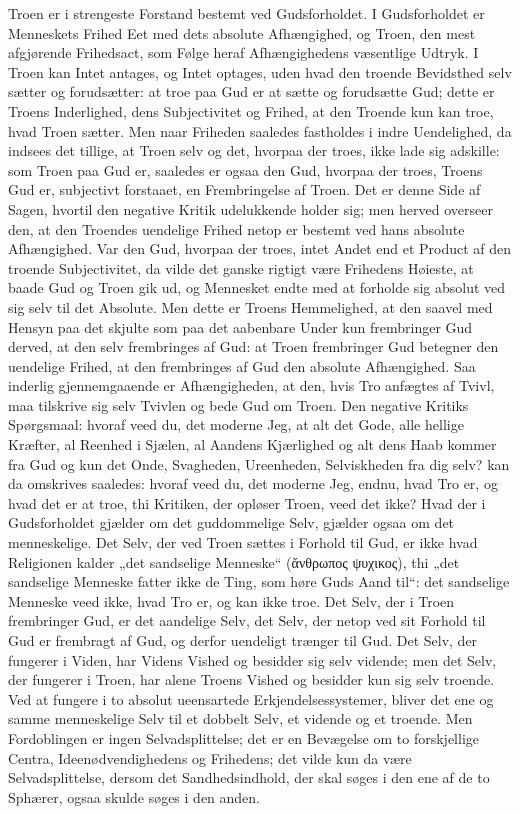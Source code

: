 \documentclass[12pt]{book}
\begin{document}
Troen er i strengeste Forstand bestemt ved Gudsforholdet. I
Gudsforholdet er Menneskets Frihed Eet
med dets absolute Afhængighed, og Troen, den mest afgjørende
Frihedsact, som Følge heraf Afhængighedens væsentlige Udtryk. I
Troen kan Intet antages, og Intet optages, uden hvad den troende
Bevidsthed selv sætter og forudsætter: at troe paa Gud er at sætte
og forudsætte Gud; dette er Troens Inderlighed, dens Subjectivitet
og Frihed, at den Troende kun kan troe, hvad Troen sætter. Men naar
Friheden saaledes fastholdes i indre Uendelighed, da indsees det
tillige, at Troen selv og det, hvorpaa der troes, ikke lade sig
adskille: som Troen paa Gud er, saaledes er ogsaa den Gud, hvorpaa
der troes, Troens Gud er, subjectivt forstaaet, en Frembringelse af
Troen. Det er denne Side af Sagen, hvortil den negative Kritik
udelukkende holder sig; men herved overseer den, at den Troendes
uendelige Frihed netop er bestemt ved hans absolute Afhængighed. Var
den Gud, hvorpaa der troes, intet Andet end et Product af den
troende Subjectivitet, da vilde det ganske rigtigt være Frihedens
Høieste, at baade Gud og Troen gik ud, og Mennesket endte med at
forholde sig absolut ved sig selv til det Absolute. Men dette er
Troens Hemmelighed, at den saavel med Hensyn paa det skjulte som paa
det aabenbare Under kun frembringer Gud derved, at den selv
frembringes af Gud: at Troen frembringer Gud betegner den uendelige
Frihed, at den frembringes af Gud den absolute Afhængighed. Saa
inderlig gjennemgaaende er Afhængigheden, at den, hvis Tro anfægtes
af Tvivl, maa tilskrive sig selv Tvivlen og bede Gud om Troen. Den
negative Kritiks Spørgsmaal: hvoraf veed du, det moderne Jeg, at alt
det Gode, alle hellige Kræfter, al Reenhed i Sjælen, al Aandens
Kjærlighed og alt dens Haab kommer fra Gud og kun det Onde,
Svagheden, Ureenheden, Selviskheden fra dig selv? kan da omskrives
saaledes: hvoraf veed du, det moderne Jeg, endnu, hvad Tro er, og
hvad det er at troe, thi Kritiken, der opløser Troen, veed det ikke?
Hvad der i Gudsforholdet gjælder om det guddommelige Selv, gjælder
ogsaa om det menneskelige. Det Selv, der ved Troen sættes i Forhold
til Gud, er ikke hvad Religionen kalder „det sandselige Menneske“
(ἄνθρωπος ψυχικος), thi „det sandselige
Menneske fatter ikke de Ting, som høre Guds Aand til“: det
sandselige Menneske veed ikke, hvad Tro er, og kan ikke troe. Det
Selv, der i Troen frembringer Gud, er det aandelige Selv, det Selv,
der netop ved sit Forhold til Gud er frembragt af Gud, og derfor
uendeligt trænger til Gud. Det Selv, der fungerer i Viden, har
Videns Vished og besidder sig selv vidende; men det Selv, der
fungerer i Troen, har alene Troens Vished og besidder kun sig selv
troende. Ved at fungere i to absolut ueensartede
Erkjendelsessystemer, bliver det ene og samme menneskelige Selv til
et dobbelt Selv, et vidende og et troende. Men Fordoblingen er ingen
Selvadsplittelse; det er en Bevægelse om to forskjellige Centra,
Ideenødvendighedens og Frihedens; det vilde kun da være
Selvadsplittelse, dersom det Sandhedsindhold, der skal søges i den
ene af de to Sphærer, ogsaa skulde søges i den anden.
\end{document}
